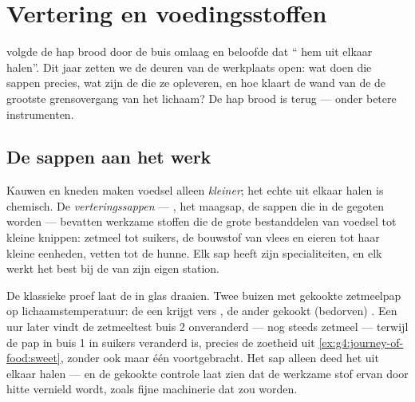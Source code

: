 \chapter{Vertering en voedingsstoffen}\label{ch:g7:digestion-and-nutrients}

 volgde de hap brood door de buis omlaag en
beloofde dat `` hem uit elkaar halen''. Dit jaar zetten we
de deuren van de werkplaats open: wat doen die sappen precies, wat zijn de
 die ze opleveren, en hoe klaart de wand van de 
de grootste grensovergang van het lichaam? De hap brood is terug --- onder
betere instrumenten.

\section{De sappen aan het werk}

\begin{proposition}\label{prop:g7:digestion-and-nutrients:chemical}
Kauwen en kneden maken voedsel alleen \emph{kleiner}; het echte uit elkaar
halen is chemisch. De \emph{verteringssappen} ---
, het maagsap, de sappen die in de  gegoten worden ---
bevatten werkzame stoffen die de grote bestanddelen van voedsel tot kleine
knippen: zetmeel tot suikers, de bouwstof van vlees en eieren tot haar
kleine eenheden, vetten tot de hunne. Elk sap heeft zijn specialiteiten,
en elk werkt het best bij de  van zijn eigen station.
\end{proposition}
\admitted

\begin{example}\label{ex:g7:digestion-and-nutrients:bench}
De klassieke proef laat de  in glas draaien. Twee buizen met
gekookte zetmeelpap op lichaamstemperatuur: de een krijgt vers ,
de ander gekookt (bedorven) . Een uur later vindt de zetmeeltest
buis 2 onveranderd --- nog steeds zetmeel --- terwijl de pap in buis 1 in
suikers veranderd is, precies de zoetheid uit
\cref{ex:g4:journey-of-food:sweet}, zonder ook maar één 
voortgebracht. Het sap alleen deed het uit elkaar halen --- en de gekookte
controle laat zien dat de werkzame stof ervan door hitte vernield wordt,
zoals fijne machinerie dat zou worden.
\end{example}

